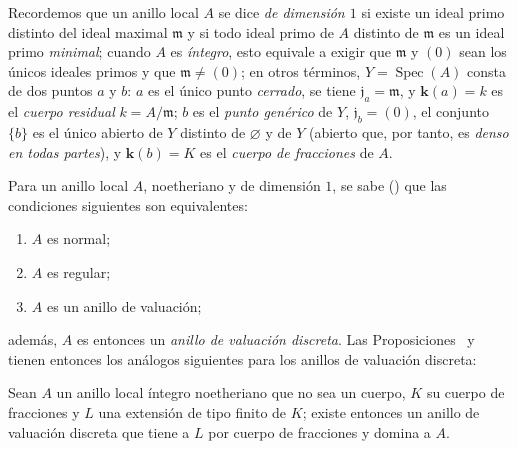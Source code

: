 \documentclass[oneside,10pt]{amsart}
\newcommand{\oldpage}[2][]{\marginnote{\normalfont\footnotesize\textbf{#1}~|~#2}\ignorespaces}
\let\EGAOriginalLabel\label
\renewcommand{\label}[1]{\phantomsection\EGAOriginalLabel{#1}}
\begin{document}
\begin{env}[7.1.5]
\label{II.7.1.5-fr}
Recordemos que un anillo local $A$ se dice \emph{de dimensión $1$} si existe un ideal primo distinto del ideal maximal $\mathfrak{m}$ y si todo ideal primo de $A$ distinto de $\mathfrak{m}$ es un ideal primo \emph{minimal};
cuando $A$ es \emph{íntegro}, esto equivale a exigir que $\mathfrak{m}$ y $(0)$ sean los únicos ideales primos y que $\mathfrak{m}\neq(0)$;
en otros términos, $Y=\operatorname{Spec}(A)$ consta de dos
\oldpage[II]{140}
puntos $a$ y $b$: $a$ es el único punto \emph{cerrado}, se tiene $\mathfrak{j}_a=\mathfrak{m}$, y $\boldsymbol{k}(a)=k$ es el \emph{cuerpo residual} $k=A/\mathfrak{m}$;
$b$ es el \emph{punto genérico} de $Y$, $\mathfrak{j}_b=(0)$, el conjunto $\{b\}$ es el único abierto de $Y$ distinto de $\varnothing$ y de $Y$ (abierto que, por tanto, es \emph{denso en todas partes}), y $\boldsymbol{k}(b)=K$ es el \emph{cuerpo de fracciones} de $A$.
\end{env}

\begin{env}[7.1.6]
\label{II.7.1.6-fr}
Para un anillo local $A$, noetheriano y de dimensión $1$, se sabe (\cite[pp.~2-08 y 17-01]{I-1}) que las condiciones siguientes son equivalentes:
\begin{enumerate}
  \item[\rm{(a)}] $A$ es normal;
  \item[\rm{(b)}] $A$ es regular;
  \item[\rm{(c)}] $A$ es un anillo de valuación;
\end{enumerate}
además, $A$ es entonces un \emph{anillo de valuación discreta}.
Las Proposiciones~ y  tienen entonces los análogos siguientes para los anillos de valuación discreta:
\end{env}


\begin{proposition}[7.1.7]
\label{II.7.1.7-fr}
Sean $A$ un anillo local íntegro noetheriano que no sea un cuerpo, $K$ su cuerpo de fracciones y $L$ una extensión de tipo finito de $K$;
existe entonces un anillo de valuación discreta que tiene a $L$ por cuerpo de fracciones y domina a $A$.
\end{proposition}
\end{document}
